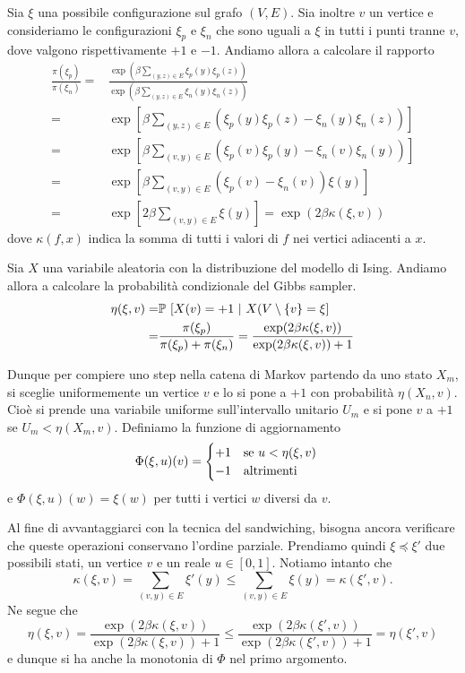 \documentclass[]{marticle}
\begin{document}
Sia $\xi$ una possibile configurazione sul grafo $(V,E)$. Sia inoltre $v$ un
vertice e consideriamo le configurazioni $\xi_p$ e $\xi_n$ che sono uguali a
$\xi$ in tutti i punti tranne $v$, dove valgono rispettivamente $+1$ e $-1$.
Andiamo allora a calcolare il rapporto
\begin{align*}
    \frac{\pi(\xi_p)}{\pi(\xi_n)} =& 
    \frac{\exp (\beta \sum_{(y,z)\in E} \xi_p(y)\xi_p(z))} {\exp
            (\beta\sum_{(y,z)\in E} \xi_n(y)\xi_n(z))} \\
    =& \exp \left[\beta\sum_{(y,z)\in E}
        \left(\xi_p(y)\xi_p(z)-\xi_n(y)\xi_n(z)\right)\right ]\\
    =& \exp \left[\beta\sum_{(v,y)\in E}
        \left(\xi_p(v)\xi_p(y)-\xi_n(v)\xi_n(y)\right)\right ]\\
    =& \exp \left[\beta\sum_{(v,y)\in E}
        \left(\xi_p(v)-\xi_n(v)\right)\xi(y)\right ]\\
    =& \exp \left[2\beta\sum_{(v,y)\in E} \xi(y)\right ]
    = \exp \left(2\beta\kappa(\xi,v)\right)
\end{align*}
dove $\kappa(f,x)$ indica la somma di tutti i valori di $f$ nei vertici
adiacenti a $x$.

Sia $X$ una variabile aleatoria con la distribuzione del modello di Ising.
Andiamo allora a calcolare la probabilit\`a condizionale del Gibbs sampler.
\begin{align*}
    \eta(\xi,v) =&
    \mathbb{P}\ [X(v)=+1\ |\ X(V\setminus \{v\}=\xi]\\
    =& \frac{\pi(\xi_p)}{\pi(\xi_p)+\pi(\xi_n)}
    = \frac{\exp(2\beta\kappa(\xi,v))}{\exp(2\beta\kappa(\xi,v))+1}
\end{align*}

Dunque per compiere uno step nella catena di Markov partendo da uno stato $X_m$,
si sceglie uniformemente un vertice $v$ e lo si pone a $+1$ con probabilit\`a
$\eta(X_n, v)$. Cio\`e si prende una variabile uniforme sull'intervallo unitario
$U_m$ e si pone $v$ a $+1$ se $U_m<\eta(X_m,v)$. Definiamo la funzione di
aggiornamento
\[
    \Phi(\xi, u)(v) = 
    \begin{cases}
        +1 \text{\quad se $u < \eta(\xi,v)$}\\
        -1 \text{\quad altrimenti}
    \end{cases}
\]
e $\Phi(\xi,u)(w) = \xi(w)$ per tutti i vertici $w$ diversi da $v$.

Al fine di avvantaggiarci con la tecnica del sandwiching, bisogna ancora
verificare che queste operazioni conservano l'ordine parziale. Prendiamo quindi
$\xi \preceq \xi'$ due possibili stati, un vertice $v$ e un reale $u\in[0,1]$.
Notiamo intanto che
\[
    \kappa(\xi,v) = \sum_{(v,y)\in E} \xi'(y) \leq
    \sum_{(v,y)\in E} \xi(y) = \kappa(\xi', v).
\]
Ne segue che 
\[
    \eta(\xi,v) = \frac{\exp(2\beta\kappa(\xi,v))}{\exp(2\beta\kappa(\xi,v))+1}
    \leq \frac{\exp(2\beta\kappa(\xi',v))}{\exp(2\beta\kappa(\xi',v))+1}
    = \eta(\xi',v)
\]
e dunque si ha anche la monotonia di $\Phi$ nel primo argomento.
\end{document}

